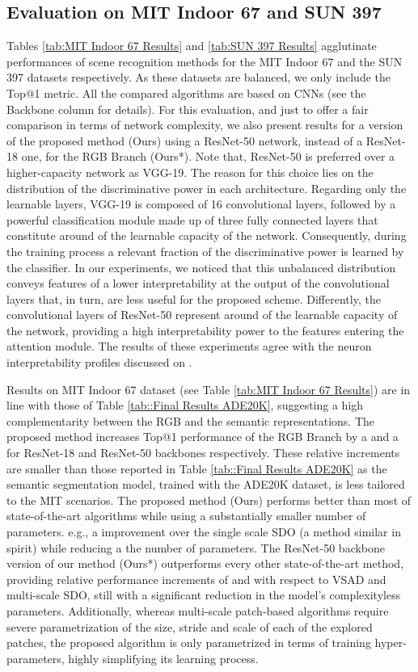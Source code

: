 \documentclass[review, 3p, sort&compress]{elsarticle}
\begin{document}
\subsection*{Evaluation on MIT Indoor 67 and SUN 397}
Tables \ref{tab:MIT Indoor 67 Results} and \ref{tab:SUN 397 Results} agglutinate performances of scene recognition methods for the MIT Indoor 67 and the SUN 397 datasets respectively. As these datasets are balanced, we only include the Top@1 metric. All the compared algorithms are based on CNNs (see the Backbone column for details). For this evaluation, and just to offer a fair comparison in terms of network complexity, we also present results for a version of the proposed method (Ours) using a ResNet-50 network, instead of a ResNet-18 one, for the RGB Branch (Ours*). Note that, ResNet-50 is preferred over a higher-capacity network as VGG-19. The reason for this choice lies on the distribution of the discriminative power in each architecture. Regarding only the learnable layers, VGG-19 is composed of 16 convolutional layers, followed by a powerful classification module made up of three fully connected layers that constitute around  of the learnable capacity of the network. Consequently, during the training process a relevant fraction of the discriminative power is learned by the classifier. In our experiments, we noticed that this unbalanced distribution conveys features of a lower interpretability at the output of the convolutional layers that, in turn, are less useful for the proposed scheme. Differently, the convolutional layers of ResNet-50 represent around  of the learnable capacity of the network, providing a high interpretability power to the features entering the attention module. The results of these experiments agree with the neuron interpretability profiles discussed on \cite{bau2017network}.

Results on MIT Indoor 67 dataset (see Table \ref{tab:MIT Indoor 67 Results}) are in line with those of Table \ref{tab::Final Results ADE20K}, suggesting a high complementarity between the RGB and the semantic representations. The proposed method increases Top@1 performance of the RGB Branch by a  and a  for ResNet-18 and ResNet-50 backbones respectively. These relative increments are smaller than those reported in Table \ref{tab::Final Results ADE20K} as the semantic segmentation model, trained with the ADE20K dataset, is less tailored to the MIT scenarios. The proposed method (Ours) performs better than most of state-of-the-art algorithms while using a substantially smaller number of parameters. e.g., a  improvement over the single scale SDO \cite{cheng2018scene} (a method similar in spirit) while reducing a  the number of parameters. The ResNet-50 backbone version of our method (Ours*) outperforms every other state-of-the-art method, providing relative performance increments of  and  with respect to VSAD and multi-scale SDO, still with a significant reduction in the model's complexity\textemdash  less parameters. Additionally, whereas multi-scale patch-based algorithms require severe parametrization of the size, stride and scale of each of the explored patches, the proposed algorithm is only parametrized in terms of training hyper-parameters, highly simplifying its learning process.
\end{document}
